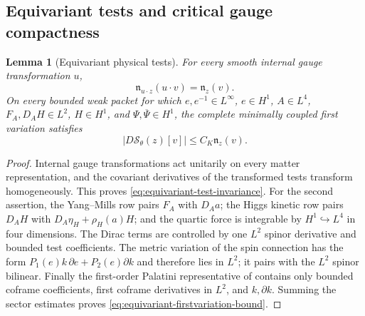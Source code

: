 \documentclass[11pt]{article}
\numberwithin{equation}{section}
\newtheorem{lemma}[lemma]{Lemma}
\theoremstyle{definition}
\theoremstyle{remark}
\newcommand{\abs}[1]{\lvert#1\rvert}
\newcommand{\Sact}{\mathscr S}
\newcommand{\bPsi}{\overline\Psi}
\begin{document}
\subsection{Equivariant tests and critical gauge compactness}

\begin{lemma}[Equivariant physical tests]
\label{lem:equivariant-tests}
For every smooth internal gauge transformation $u$,
\begin{equation}
 \mathfrak n_{u\cdot z}(u\cdot v)=\mathfrak n_z(v).
 \label{eq:equivariant-test-invariance}
\end{equation}
On every bounded weak packet for which
$e,e^{-1}\in L^\infty$, $e\in H^1$, $A\in L^4$, $F_A,D_AH\in L^2$,
$H\in H^1$, and $\Psi,\bPsi\in H^1$, the complete minimally coupled first
variation satisfies
\begin{equation}
 \abs{D\Sact_\theta(z)[v]}\le C_K\mathfrak n_z(v).
 \label{eq:equivariant-firstvariation-bound}
\end{equation}
\end{lemma}
\begin{proof}
Internal gauge transformations act unitarily on every matter representation,
and the covariant derivatives of the transformed tests transform
homogeneously.  This proves \eqref{eq:equivariant-test-invariance}.  For the
second assertion, the Yang--Mills row pairs $F_A$ with $D_Aa$; the Higgs
kinetic row pairs $D_AH$ with
$D_A\eta_H+\rho_H(a)H$; and the quartic force is integrable by
$H^1\hookrightarrow L^4$ in four dimensions.  The Dirac terms are controlled
by one $L^2$ spinor derivative and bounded test coefficients.  The metric
variation of the spin connection has the form
$P_1(e)k\,\partial e+P_2(e)\partial k$ and therefore lies in $L^2$; it pairs
with the $L^2$ spinor bilinear.  Finally the first-order Palatini
representative of  contains only bounded coframe
coefficients, first coframe derivatives in $L^2$, and $k,\partial k$.
Summing the sector estimates proves \eqref{eq:equivariant-firstvariation-bound}.
\end{proof}
\end{document}
